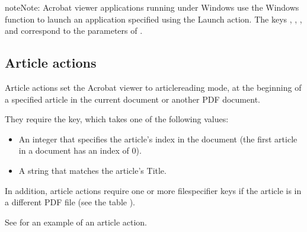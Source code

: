 \documentclass[letterpaper,12pt,english,openany,oneside]{sphinxmanual}
\begin{document}
\begin{sphinxadmonition}{note}{Note:}
Acrobat viewer applications running under Windows use the Windows function  to launch an application specified using the Launch action. The keys  ,  ,  , and  correspond to the parameters of  .
\end{sphinxadmonition}


\subsection{Article actions}
\label{\detokenize{pdfmark_Actions:article-actions}}
Article actions set the Acrobat viewer to article\sphinxhyphen{}reading mode, at the beginning of a specified article in the current document or another PDF document.

They require the  key, which takes one of the following values:
\begin{itemize}
\item {} 
An integer that specifies the article’s index in the document (the first article in a document has an index of 0).

\item {} 
A string that matches the article’s Title.

\end{itemize}

In addition, article actions require one or more file\sphinxhyphen{}specifier keys if the article is in a different PDF file (see the table ).

See  for an example of an article action.
\end{document}
